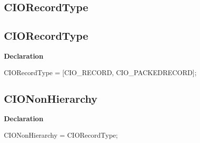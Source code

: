 \documentclass{report}
\newif\ifpdf
\begin{document}
\subsection*{\large{\textbf{CIORecordType}}\normalsize\hspace{1ex}\hrulefill}
\else
\subsection*{CIORecordType}
\fi
\label{PasDoc_Items-CIORecordType}
\begin{list}{}{
\setlength{\itemindent}{0cm}
\setlength{\listparindent}{0cm}
\setlength{\leftmargin}{\evensidemargin}
\addtolength{\leftmargin}{\tmplength}
\settowidth{\labelsep}{X}
\addtolength{\leftmargin}{\labelsep}
\setlength{\labelwidth}{\tmplength}
}
\item[\textbf{Declaration}\hfill]
\ifpdf
\begin{flushleft}
\fi
\begin{ttfamily}
CIORecordType = [CIO{\_}RECORD, CIO{\_}PACKEDRECORD];\end{ttfamily}

\ifpdf
\end{flushleft}
\fi

\end{list}
\ifpdf
\subsection*{\large{\textbf{CIONonHierarchy}}\normalsize\hspace{1ex}\hrulefill}
\else
\subsection*{CIONonHierarchy}
\fi
\label{PasDoc_Items-CIONonHierarchy}
\begin{list}{}{
\setlength{\itemindent}{0cm}
\setlength{\listparindent}{0cm}
\setlength{\leftmargin}{\evensidemargin}
\addtolength{\leftmargin}{\tmplength}
\settowidth{\labelsep}{X}
\addtolength{\leftmargin}{\labelsep}
\setlength{\labelwidth}{\tmplength}
}
\item[\textbf{Declaration}\hfill]
\ifpdf
\begin{flushleft}
\fi
\begin{ttfamily}
CIONonHierarchy = CIORecordType;\end{ttfamily}

\ifpdf
\end{flushleft}
\fi

\end{list}
\ifpdf
\end{document}
